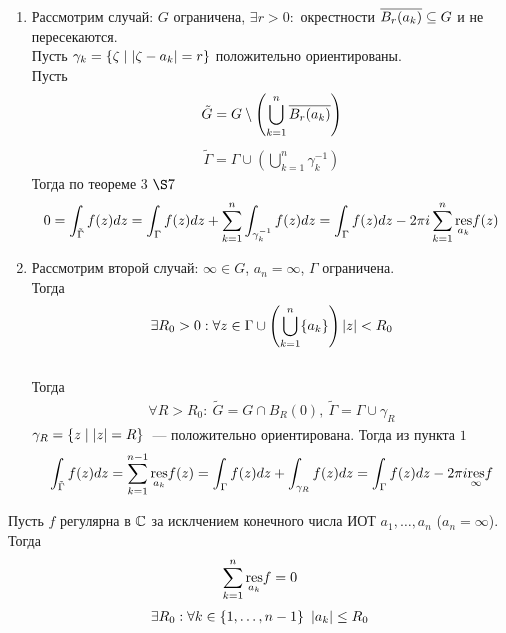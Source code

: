 \begin{enumerate}
    \item Рассмотрим случай: $G$ ограничена, $\exists r > 0:$ окрестности
    $\overline{B_r(a_k)}\subseteq G$ и не пересекаются.
    \\
    Пусть $\gamma_k = \{\zeta \mid \left|{\zeta - a_k}\right| = r\}$ положительно
    ориентированы.
    \\
    Пусть
    \begin{align*}
      \tilde{G} = G \setminus \left( \bigcup_{k=1}^n\overline{B_r(a_k)} \right)
    \end{align*}
    \begin{align*}
      \tilde{\Gamma} = \Gamma \cup \left( \bigcup_{k=1}^n  \gamma_k^{-1} \right)
    \end{align*}
    Тогда по теореме $3$ $\S7$
    \begin{align*}
      0 = \int_{\tilde{\Gamma}}f(z)dz =  \int_{\Gamma}f(z)dz + \sum_{k=1}^n\int_{\gamma_k^{-1}}f(z)dz =  \int_{\Gamma}f(z)dz -2 \pi i \sum_{k=1}^n\underset{a_k}{\mathrm{res}}f(z)
    \end{align*}
    \item Рассмотрим второй случай: $\infty \in G$, $a_n = \infty$, $\Gamma$
    ограничена.
    \\
    Тогда
    \begin{align*}
      \exists R_0 > 0: \forall z \in \Gamma \cup \left( \bigcup_{k=1}^n\{a_k\} \right) \left|{z}\right| < R_0
    \end{align*}
    \\
    Тогда 
    \begin{align*}
      \forall R > R_0: \ \tilde{G} = G \cap B_R(0), \ \tilde{\Gamma} = \Gamma \cup \gamma_R
    \end{align*}
    $\gamma_R = \{z \mid \left|{z}\right| = R\}$~--- положительно ориентирована.
    Тогда из пункта $1$
    \begin{align*}
      \int_{\tilde{\Gamma}}f(z)dz =  \sum_{k=1}^{n-1}\underset{a_k}{\mathrm{res}}f(z) =  \int_{\Gamma}f(z)dz +  \int_{\gamma_R}f(z)dz =  \int_{\Gamma}f(z)dz - 2 \pi i \underset{\infty}{\mathrm{res}} f
    \end{align*}
\end{enumerate}
\corollary
Пусть $f$ регулярна в $\mathbb{C}$ за исклчением конечного числа ИОТ $a_1, \dots, a_n$
($a_n = \infty$). Тогда
\begin{equation}\label{(13.8)}
    \sum_{k=1}^n\underset{a_k}{\mathrm{res}}f = 0
\end{equation}
\pr
\begin{align*}
  \exists R_0: \forall k \in \{1, \dots, n-1\} \ \left|{a_k}\right| \leq R_0
\end{align*}
